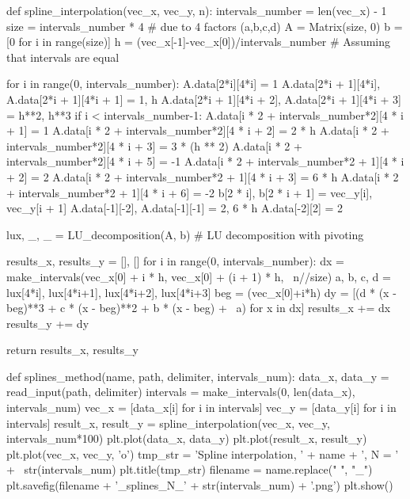 \documentclass{article}
\begin{document}
\begin{python}
def spline_interpolation(vec_x, vec_y, n):
    intervals_number = len(vec_x) - 1
    size = intervals_number * 4  # due to 4 factors (a,b,c,d)
    A = Matrix(size, 0)
    b = [0 for i in range(size)]
    h = (vec_x[-1]-vec_x[0])/intervals_number  
    # Assuming that intervals are equal

    for i in range(0, intervals_number):
        A.data[2*i][4*i] = 1
        A.data[2*i + 1][4*i], A.data[2*i + 1][4*i + 1] = 1, h
        A.data[2*i + 1][4*i + 2], A.data[2*i + 1][4*i + 3] = h**2, h**3
        if i < intervals_number-1:
            A.data[i * 2 + intervals_number*2][4 * i + 1] = 1
            A.data[i * 2 + intervals_number*2][4 * i + 2] = 2 * h
            A.data[i * 2 + intervals_number*2][4 * i + 3] = 3 * (h ** 2)
            A.data[i * 2 + intervals_number*2][4 * i + 5] = -1
            A.data[i * 2 + intervals_number*2 + 1][4 * i + 2] = 2
            A.data[i * 2 + intervals_number*2 + 1][4 * i + 3] = 6 * h
            A.data[i * 2 + intervals_number*2 + 1][4 * i + 6] = -2
        b[2 * i], b[2 * i + 1] = vec_y[i], vec_y[i + 1]
    A.data[-1][-2], A.data[-1][-1] = 2, 6 * h
    A.data[-2][2] = 2

    lux, _, _ = LU_decomposition(A, b)  # LU decomposition with pivoting

    results_x, results_y = [], []
    for i in range(0, intervals_number):
        dx = make_intervals(vec_x[0] + i * h, vec_x[0] + (i + 1) * h, \
                            n//size)
        a, b, c, d = lux[4*i], lux[4*i+1], lux[4*i+2], lux[4*i+3]
        beg = (vec_x[0]+i*h)
        dy = [(d * (x - beg)**3 + c * (x - beg)**2 + b * (x - beg) + \
               a) for x in dx] 
        results_x += dx
        results_y += dy

    return results_x, results_y


def splines_method(name, path, delimiter, intervals_num):
    data_x, data_y = read_input(path, delimiter)
    intervals = make_intervals(0, len(data_x), intervals_num)
    vec_x = [data_x[i] for i in intervals]
    vec_y = [data_y[i] for i in intervals]
    result_x, result_y = spline_interpolation(vec_x, vec_y, 
                                              intervals_num*100)
    plt.plot(data_x, data_y)
    plt.plot(result_x, result_y)
    plt.plot(vec_x, vec_y, 'o')
    tmp_str = 'Spline interpolation, ' + name + ', N = ' + \
               str(intervals_num)
    plt.title(tmp_str)
    filename = name.replace(" ", "_")
    plt.savefig(filename + '_splines_N_' + str(intervals_num) + '.png')
    plt.show()
\end{python}
\end{document}
